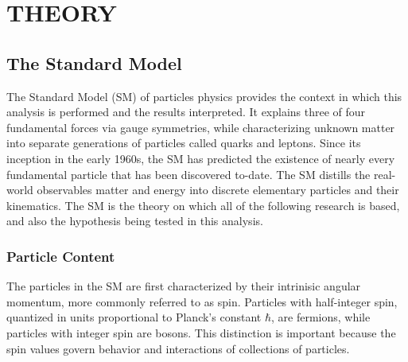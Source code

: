 %
%

\chapter{THEORY}
\label{chap:theory}
\section{The Standard Model}
\label{sec:sm}
The Standard Model (SM) of particles physics provides the context in which this analysis is performed and the results interpreted. 
It explains three of four fundamental forces via gauge symmetries, while characterizing unknown matter into
separate generations of particles called quarks and leptons. Since its inception in the early 1960s, the SM has predicted the existence of nearly every fundamental particle that has been discovered to-date.
The SM distills the real-world observables matter and energy into discrete elementary particles and their kinematics. The SM is the theory on which all of the following research is based, and also the hypothesis being tested in this analysis.

\subsection{Particle Content}
The particles in the SM are first characterized by their intrinisic angular momentum, more commonly referred to as spin. Particles with half-integer spin, quantized in units proportional to Planck's constant $\hbar$, are fermions, while particles with integer spin are bosons.
This distinction is important because the spin values govern behavior and interactions of collections of particles. 

